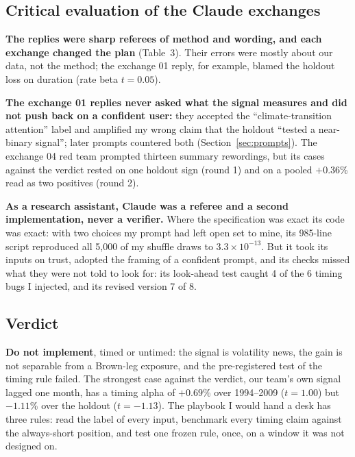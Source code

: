 \subsection{Critical evaluation of the Claude exchanges}
\label{sec:claude}

\textbf{The replies were sharp referees of method and wording, and each exchange changed the plan} (Table~3). Their errors were mostly about our data, not the method; the exchange 01 reply, for example, blamed the holdout loss on duration (rate beta $t=0.05$).

\textbf{The exchange 01 replies never asked what the signal measures and did not push back on a confident user:} they accepted the ``climate-transition attention'' label and amplified my wrong claim that the holdout ``tested a near-binary signal''; later prompts countered both (Section~\ref{sec:prompts}). The exchange 04 red team prompted thirteen summary rewordings, but its cases against the verdict rested on one holdout sign (round 1) and on a pooled $+0.36$\% read as two positives (round 2).

\textbf{As a research assistant, Claude was a referee and a second implementation, never a verifier.} Where the specification was exact its code was exact: with two choices my prompt had left open set to mine, its 985-line script reproduced all 5,000 of my shuffle draws to $3.3\times10^{-13}$. But it took its inputs on trust, adopted the framing of a confident prompt, and its checks missed what they were not told to look for: its look-ahead test caught 4 of the 6 timing bugs I injected, and its revised version 7 of 8.

\subsection{Verdict}
\label{sec:verdict}

\textbf{Do not implement}, timed or untimed: the signal is volatility news, the gain is not separable from a Brown-leg exposure, and the pre-registered test of the timing rule failed. The strongest case against the verdict, our team's own signal lagged one month, has a timing alpha of $+0.69$\% over 1994--2009 ($t=1.00$) but $-1.11$\% over the holdout ($t=-1.13$). The playbook I would hand a desk has three rules: read the label of every input, benchmark every timing claim against the always-short position, and test one frozen rule, once, on a window it was not designed on.

